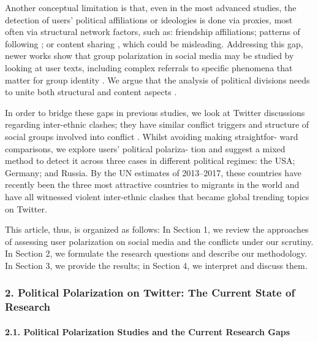 Another conceptual limitation is that, even in the most advanced studies, the detection of users’ political affiliations or ideologies is done via proxies, most often via structural network factors, such as: friendship affiliations; patterns of following \cite{BarberaJostNagler,Rivero}; or content sharing \cite{ColleoniRozzaArvidsson}, which could be misleading. Addressing this gap, newer works show that group polarization in social media may be studied by looking at user texts, including complex referrals to specific phenomena that matter for group identity \cite{Evolvi}. We argue that the analysis of political divisions needs to unite both structural and content aspects \cite{Bodrunova}.

In order to bridge these gaps in previous studies, we look at Twitter discussions regarding inter-ethnic clashes; they have similar conflict triggers and structure of social groups involved into conflict \cite{BodrunovaLitvinenkoBlekanov2017}. Whilst avoiding making straightfor- ward comparisons, we explore users’ political polariza- tion and suggest a mixed method to detect it across three cases in different political regimes: the USA; Germany; and Russia. By the UN estimates of 2013–2017, these countries have recently been the three most attractive countries to migrants in the world \cite{UN2013,UN2017} and have all witnessed violent inter-ethnic clashes that became global trending topics on Twitter.

This article, thus, is organized as follows: In Section 1, we review the approaches of assessing user polarization on social media and the conflicts under our scrutiny. In Section 2, we formulate the research questions and describe our methodology. In Section 3, we provide the results; in Section 4, we interpret and discuss them.

\subsubsection{2. Political Polarization on Twitter: The Current State of Research}

\paragraph{2.1. Political Polarization Studies and the Current Research Gaps}

